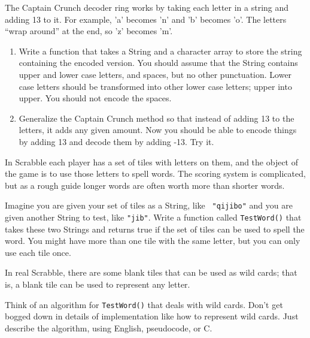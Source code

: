 
\begin{exercise}

The Captain Crunch decoder ring works by taking each letter in a
string and adding 13 to it.  For example, 'a' becomes 'n' and 'b'
becomes 'o'.  The letters ``wrap around'' at the end, so 'z' becomes
'm'.

\begin{enumerate}
\item  Write a function that takes a String and a character array to store the string 
containing the encoded version.  You should assume that the String
contains upper and lower case letters, and spaces, but no other
punctuation.  Lower case letters should be transformed into other lower
case letters; upper into upper.  You should not encode the spaces.

\item Generalize the Captain Crunch method so that instead of adding
13 to the letters, it adds any given amount.  Now you should be able
to encode things by adding 13 and decode them by adding -13.  Try it.

\end{enumerate}
\end{exercise}



\begin{exercise}
In Scrabble each player has a set of tiles with letters on them, and
the object of the game is to use those letters to spell words.  The
scoring system is complicated, but as a rough guide longer words are
often worth more than shorter words.

Imagine you are given your set of tiles as a String, like {\tt
"qijibo"} and you are given another String to test, like {\tt "jib"}.
Write a function called {\tt TestWord()} that takes these two Strings and
returns true if the set of tiles can be used to spell the word.  You
might have more than one tile with the same letter, but you can only
use each tile once.
\end{exercise}






\begin{exercise}
In real Scrabble, there are some blank tiles that can be used
as wild cards; that is, a blank tile can be used to represent
any letter.

Think of an algorithm for {\tt TestWord()} that deals with wild
cards.  Don't get bogged down in details of implementation like
how to represent wild cards.  Just describe the algorithm, using
English, pseudocode, or C.
\end{exercise}




